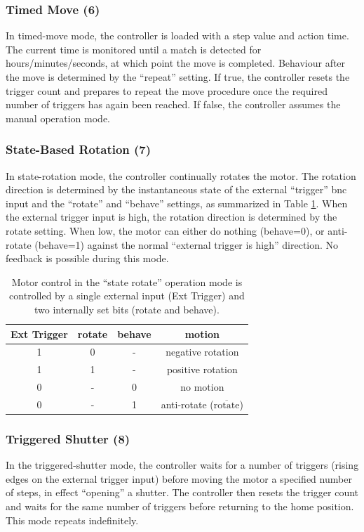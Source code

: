\documentclass[10pt]{article}
\begin{document}
\subsubsection{Timed Move (6)}
In timed-move mode, the controller is loaded with a step value and action time.  The current time is monitored until a match is detected for hours/minutes/seconds, at which point the move is completed.  Behaviour after the move is determined by the ``repeat'' setting.  If true, the controller resets the trigger count and prepares to repeat the move procedure once the required number of triggers has again been reached.  If false, the controller assumes the manual operation mode.

\subsubsection{State-Based Rotation (7)}
In state-rotation mode, the controller continually rotates the motor.  The rotation direction is determined by the instantaneous state of the external ``trigger'' bnc input and the ``rotate'' and ``behave'' settings, as summarized in Table \ref{State_Rotate_Table}.  When the external trigger input is high, the rotation direction is determined by the rotate setting.  When low, the motor can either do nothing (behave=0), or anti-rotate (behave=1) against the normal ``external trigger is high'' direction.  No feedback is possible during this mode.    

\begin{table}
\centering
\begin{tabular}{|c|c|c|c|}
\hline
Ext Trigger & rotate & behave & motion \\
\hline
1 & 0 & - & negative rotation \\
\hline
1 & 1 & - & positive rotation \\
\hline
0 & - & 0 & no motion \\
\hline
0 & - & 1 & anti-rotate ($\overline{\text{rotate}}$)  \\
\hline
\end{tabular}
\caption{Motor control in the ``state rotate'' operation mode is controlled by a single external input (Ext Trigger) and two internally set bits (rotate and behave).}
\label{State_Rotate_Table}
\end{table}  

\subsubsection{Triggered Shutter (8)}
In the triggered-shutter mode, the controller waits for a number of triggers (rising edges on the external trigger input) before moving the motor a specified number of steps, in effect ``opening'' a shutter.  The controller then resets the trigger count and waits for the same number of triggers before returning to the home position.  This mode repeats indefinitely.  
\end{document}
